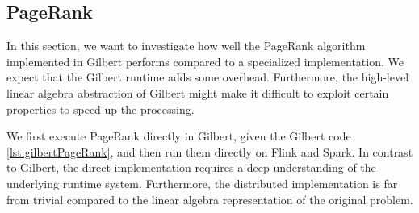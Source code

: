




\subsection{PageRank}

In this section, we want to investigate how well the PageRank algorithm~\cite{page:1999a} implemented in Gilbert performs compared to a specialized implementation.
We expect that the Gilbert runtime adds some overhead.
Furthermore, the high-level linear algebra abstraction of Gilbert might make it difficult to exploit certain properties to speed up the processing.

We first execute PageRank directly in Gilbert, given the Gilbert code \cref{lst:gilbertPageRank}, and then run them directly on Flink and Spark.
In contrast to Gilbert, the direct implementation requires a deep understanding of the underlying runtime system.
Furthermore, the distributed implementation is far from trivial compared to the linear algebra representation of the original problem.

